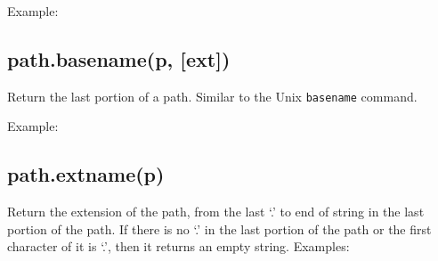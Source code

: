 Example:

\begin{Shaded}
\begin{Highlighting}[]
\NormalTok{(}\NormalTok{)}
\end{Highlighting}
\end{Shaded}

\subsection{path.basename(p, {[}ext{]})}\label{path.basenamep-ext}

Return the last portion of a path. Similar to the Unix \texttt{basename}
command.

Example:

\begin{Shaded}
\begin{Highlighting}[]
\NormalTok{(}\NormalTok{)}

\NormalTok{(}\NormalTok{, }\NormalTok{)}
\end{Highlighting}
\end{Shaded}

\subsection{path.extname(p)}\label{path.extnamep}

Return the extension of the path, from the last `.' to end of string in
the last portion of the path. If there is no `.' in the last portion of
the path or the first character of it is `.', then it returns an empty
string. Examples:

\begin{Shaded}
\begin{Highlighting}[]
\NormalTok{(}\NormalTok{)}

\NormalTok{(}\NormalTok{)}

\NormalTok{(}\NormalTok{)}

\NormalTok{(}\NormalTok{)}
\end{Highlighting}
\end{Shaded}

